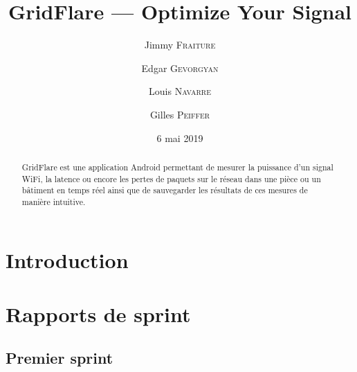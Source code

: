 \documentclass{elsarticle}
\begin{document}
\title{GridFlare --- Optimize Your Signal}
\date{6 mai 2019}

\address[add1]{École Polytechnique, Université catholique de Louvain, Place de l'Université 1, 1348 Ottignies-Louvain-la-Neuve, Belgique}

\author[add1]{Jimmy \textsc{Fraiture}}

\author[add1]{Edgar \textsc{Gevorgyan}}

\author[add1]{Louis \textsc{Navarre}}

\author[add1]{Gilles \textsc{Peiffer}}

\begin{abstract}
GridFlare est une application Android permettant de mesurer la puissance d'un signal WiFi, la latence ou encore les pertes de paquets sur le réseau dans une pièce ou un bâtiment en temps réel ainsi que de sauvegarder les résultats de ces mesures de manière intuitive.
\end{abstract}
\maketitle

\section{Introduction}
\section{Rapports de sprint}
\subsection{Premier sprint}
\end{document}
